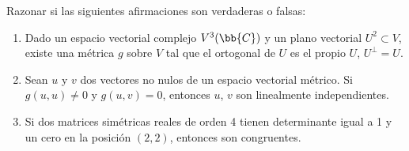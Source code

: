 \documentclass[12pt]{article}
\begin{document}
    \begin{ejercicio}
        Razonar si las siguientes afirmaciones son verdaderas o falsas:
        \begin{enumerate}
            \item Dado un espacio vectorial complejo $V^3(\bb{C})$ y un plano vectorial $U^2 \subset V$, existe una métrica $g$ sobre $V$ tal que el ortogonal de $U$ es el propio $U$, $U^{\bot} = U$.
            \item Sean $u$ y $v$ dos vectores no nulos de un espacio vectorial métrico. Si $g(u,u) \neq 0 $ y $g(u,v)=0$, entonces $u$, $v$ son linealmente independientes.
            \item Si dos matrices simétricas reales de orden 4 tienen determinante igual a 1 y un cero en la posición $(2,2)$, entonces son congruentes.
        \end{enumerate}
    \end{ejercicio}


   
\end{document}
